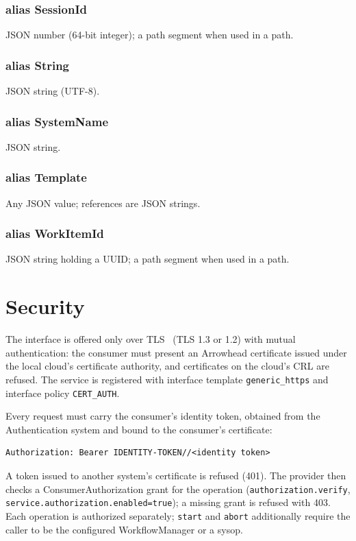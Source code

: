 \documentclass[a4paper]{arrowhead}
\newcommand{\pdef}[1]{{\textcolor{ArrowheadGrey}{#1\label{sec:model:primitives:#1}\label{sec:model:primitives:#1s}}}}
\begin{document}
\subsubsection*{alias \pdef{SessionId}}
JSON number (64-bit integer); a path segment when used in a path.

\subsubsection*{alias \pdef{String}}
JSON string (UTF-8).

\subsubsection*{alias \pdef{SystemName}}
JSON string.

\subsubsection*{alias \pdef{Template}}
Any JSON value; references are JSON strings.

\subsubsection*{alias \pdef{WorkItemId}}
JSON string holding a UUID; a path segment when used in a path.



\section{Security}
\label{sec:security}
The interface is offered only over TLS~\cite{rfc8446} (TLS 1.3 or 1.2) with mutual authentication: the consumer must
present an Arrowhead certificate issued under the local cloud's certificate authority, and certificates on the
cloud's CRL are refused. The service is registered with interface template \texttt{generic\_\allowbreak{}https} and interface
policy \texttt{CERT\_AUTH}.

Every request must carry the consumer's identity token, obtained from the Authentication system and bound to the
consumer's certificate:
\begin{lstlisting}
Authorization: Bearer IDENTITY-TOKEN//<identity token>
\end{lstlisting}
A token issued to another system's certificate is refused (401). The provider then checks a ConsumerAuthorization
grant for the operation (\texttt{authorization.\allowbreak{}verify}, \texttt{service.\allowbreak{}authorization.\allowbreak{}enabled=\allowbreak{}true}); a missing grant is
refused with 403. Each operation is authorized separately; \texttt{start} and \texttt{abort} additionally require the caller to be the configured WorkflowManager or a sysop.
\end{document}
